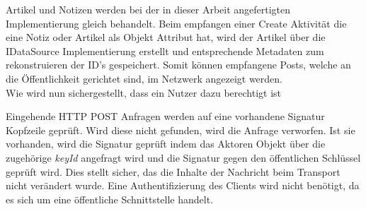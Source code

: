 Artikel und Notizen werden bei der in dieser Arbeit angefertigten Implementierung gleich behandelt. Beim empfangen einer Create Aktivität die eine Notiz oder Artikel als Objekt Attribut hat, wird der Artikel über die IDataSource Implementierung erstellt und entsprechende Metadaten zum rekonstruieren der ID's gespeichert. Somit können empfangene Posts, welche an die Öffentlichkeit gerichtet sind, im Netzwerk angezeigt werden.\\

Wie wird nun sichergestellt, dass ein Nutzer dazu berechtigt ist 

Eingehende HTTP POST Anfragen werden auf eine vorhandene Signatur Kopfzeile geprüft. Wird diese nicht gefunden, wird die Anfrage verworfen. Ist sie vorhanden, wird die Signatur geprüft indem das Aktoren Objekt über die zugehörige \textit{keyId} angefragt wird und die Signatur gegen den öffentlichen Schlüssel geprüft wird. Dies stellt sicher, das die Inhalte der Nachricht beim Transport nicht verändert wurde. Eine Authentifizierung des Clients wird nicht benötigt, da es sich um eine öffentliche Schnittstelle handelt.